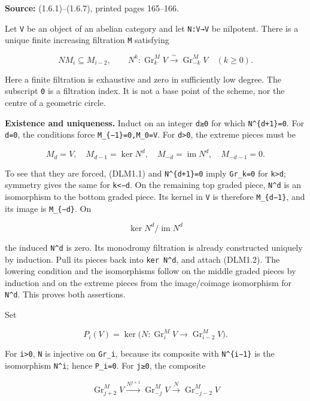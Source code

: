 \documentclass[
]{report}
\begin{document}
\textbf{Source:} (1.6.1)--(1.6.7), printed pages 165--166.

Let \texttt{V} be an object of an abelian category and let
\texttt{N:V→V} be nilpotent. There is a unique finite increasing
filtration \texttt{M} satisfying

\[
NM_i\subseteq M_{i-2},\qquad
N^k:\operatorname{Gr}_k^M V\xrightarrow{\sim}\operatorname{Gr}_{-k}^M V
\quad(k\ge0).
\tag{DLM1.1}
\]

Here a finite filtration is exhaustive and zero in sufficiently low
degree. The subscript \texttt{0} is a filtration index. It is not a base
point of the scheme, nor the centre of a geometric circle.

\textbf{Existence and uniqueness.} Induct on an integer \texttt{d≥0} for
which \texttt{N\^{}\{d+1\}=0}. For \texttt{d=0}, the conditions force
\texttt{M\_\{−1\}=0,M\_0=V}. For \texttt{d\textgreater{}0}, the extreme
pieces must be

\[
M_d=V,\quad M_{d-1}=\ker N^d,\quad
M_{-d}=\operatorname{im}N^d,\quad M_{-d-1}=0.
\tag{DLM1.2}
\]

To see that they are forced, (DLM1.1) and \texttt{N\^{}\{d+1\}=0} imply
\texttt{Gr\_k=0} for \texttt{k\textgreater{}d}; symmetry gives the same
for \texttt{k\textless{}−d}. On the remaining top graded piece,
\texttt{N\^{}d} is an isomorphism to the bottom graded piece. Its kernel
in \texttt{V} is therefore \texttt{M\_\{d−1\}}, and its image is
\texttt{M\_\{−d\}}. On

\[
\ker N^d/\operatorname{im}N^d
\]

the induced \texttt{N\^{}d} is zero. Its monodromy filtration is already
constructed uniquely by induction. Pull its pieces back into
\texttt{ker\ N\^{}d}, and attach (DLM1.2). The lowering condition and
the isomorphisms follow on the middle graded pieces by induction and on
the extreme pieces from the image/coimage isomorphism for
\texttt{N\^{}d}. This proves both assertions.

Set

\[
P_i(V)=\ker\bigl(N:\operatorname{Gr}_i^M V\longrightarrow
\operatorname{Gr}_{i-2}^M V\bigr).
\tag{DLM1.3}
\]

For \texttt{i\textgreater{}0}, \texttt{N} is injective on
\texttt{Gr\_i}, because its composite with \texttt{N\^{}\{i−1\}} is the
isomorphism \texttt{N\^{}i}; hence \texttt{P\_i=0}. For \texttt{j≥0},
the composite

\[
\operatorname{Gr}_{j+2}^M V
\xrightarrow{N^{j+1}}\operatorname{Gr}_{-j}^M V
\xrightarrow{N}\operatorname{Gr}_{-j-2}^M V
\]
\end{document}
